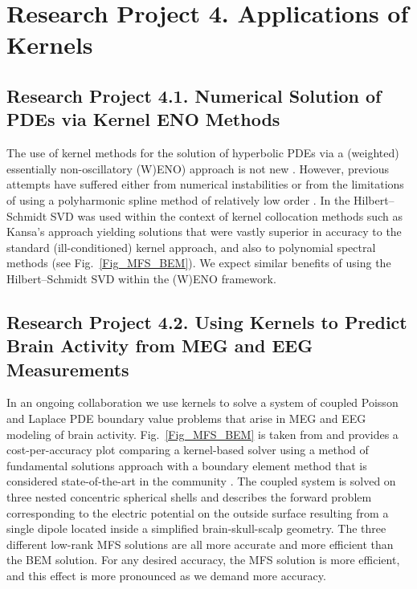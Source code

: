 \documentclass[11pt]{NSFamsart}
\begin{document}
\section*{Research Project 4. Applications of Kernels}
\label{appsec}
\subsection*{Research Project 4.1. Numerical Solution of PDEs via Kernel ENO Methods}  \label{PDEsubsec}
The use of kernel methods for the solution of hyperbolic PDEs via a (weighted) essentially non-oscillatory (W)ENO) approach is not new \citep{CecilEtAl04,IskeSonar96}. However, previous attempts have suffered either from numerical instabilities \citep{CecilEtAl04} or from the limitations of using a polyharmonic spline method of relatively low order \citep{IskeSonar96}. In \citep{McCourt13} the Hilbert--Schmidt SVD was used within the context of kernel collocation methods such as Kansa's approach \citep{Fas07a} yielding solutions that were vastly superior in accuracy to the standard (ill-conditioned) kernel approach, and also to polynomial spectral methods (see Fig.~\ref{Fig_MFS_BEM}). We expect similar benefits of using the Hilbert--Schmidt SVD within the (W)ENO framework.

\subsection*{Research Project 4.2. Using Kernels to Predict Brain Activity from MEG and EEG Measurements} \label{SectMEEG}
In an ongoing collaboration we use kernels to solve a system of coupled Poisson and Laplace PDE boundary value problems that arise in MEG and EEG modeling of brain activity. Fig.~\ref{Fig_MFS_BEM} is taken from \citep{AFFGM13} and provides a cost-per-accuracy plot comparing a kernel-based solver using a method of fundamental solutions approach with a boundary element method that is considered state-of-the-art in the community \citep{fieldtrip11}. The coupled system is solved on three nested concentric spherical shells and describes the forward problem corresponding to the electric potential on the outside surface resulting from a single dipole located inside a simplified brain-skull-scalp geometry. The three different low-rank MFS solutions are all more accurate and more efficient than the BEM solution. For any desired accuracy, the MFS solution is more efficient, and this effect is more pronounced as we demand more accuracy.
\end{document}
